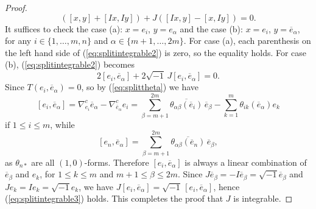 \documentclass{amsart}
\numberwithin{equation}{section}
\theoremstyle{definition}
\renewcommand{\1}{\mathds{1}}
\renewcommand{\>}{\rightarrow}
\begin{document}
\begin{proof}
\begin{equation}
 ([x,y] + [Ix,Iy]) + J ([Ix,y] - [x,Iy]) =0 .
 \end{equation}
It suffices to check the case (a): $x=e_i$, $y=e_{\alpha}$ and the case (b):  $x=e_i$, $y=\overline{e}_{\alpha}$, for any $i\in \{ 1, \ldots , m,n\}$ and $\alpha \in \{ m\!+\!1, \ldots , 2m\}$. For case (a), each parenthesis on the left hand side of (\ref{eq:splitintegrable2}) is zero, so the equality holds. For case (b), (\ref{eq:splitintegrable2}) becomes
\begin{equation} \label{eq:splitintegrable3}
2[e_i, \overline{e}_{\alpha}] + 2\sqrt{-1}\,J [ e_i, \overline{e}_{\alpha}]=0.
 \end{equation}
Since $T(e_i, \overline{e}_{\alpha})=0$, so by (\ref{eq:splittheta}) we have
$$ [e_i, \overline{e}_{\alpha}] = \nabla^c_{e_i}\overline{e}_{\alpha} - \nabla^c_{\overline{e}_{\alpha}}e_i = \sum_{\beta =m+1}^{2m}  \overline{\theta_{\alpha \beta} (\overline{e}_i) } \, \overline{e}_{\beta} -  \sum_{k=1}^{m} \theta_{ik} (\overline{e}_{\alpha}) e_k $$
if $1\leq i\leq m$, while
$$ [e_n, \overline{e}_{\alpha}] =  \sum_{\beta =m+1}^{2m}  \overline{\theta_{\alpha \beta} (\overline{e}_n) } \, \overline{e}_{\beta} , $$
as $\theta_{n\ast}$ are all $(1,0)$-forms.
Therefore $[e_i, \overline{e}_{\alpha}] $ is always a linear combination of $\overline{e}_{\beta}$ and $e_k$, for $1\leq k\leq m$ and $m\!+\!1\leq \beta \leq 2m$. Since $J\overline{e}_{\beta}=-I\overline{e}_{\beta}= \sqrt{-1}\overline{e}_{\beta}$ and $Je_k=Ie_k=\sqrt{-1}e_k$, we have $J[e_i, \overline{e}_{\alpha}] = \sqrt{-1}\,[e_i, \overline{e}_{\alpha}]$, hence (\ref{eq:splitintegrable3}) holds. This completes the proof that $J$ is integrable.


\end{proof}
\end{document}
